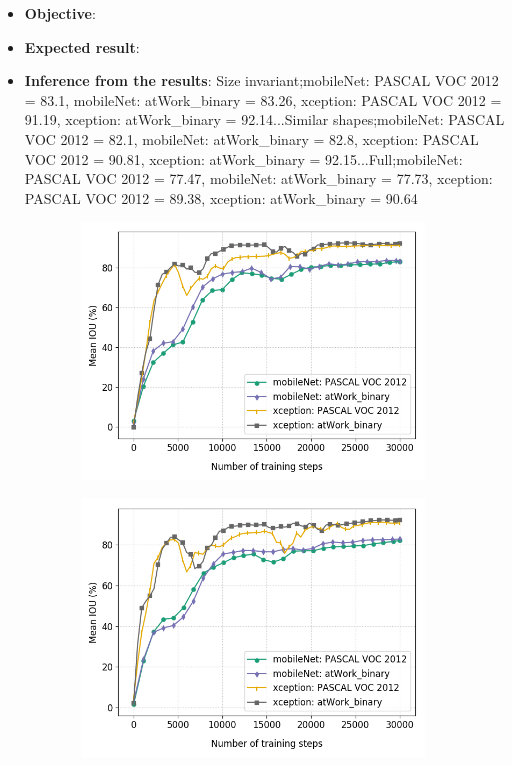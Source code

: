 	\begin{itemize}
		\item \textbf{Objective}:
		\item \textbf{Expected result}:
		\item \textbf{Inference from the results}: Size invariant;mobileNet: PASCAL VOC 2012 = 83.1, mobileNet: atWork\_binary = 83.26, xception: PASCAL VOC 2012 = 91.19, xception: atWork\_binary = 92.14...Similar shapes;mobileNet: PASCAL VOC 2012 = 82.1, mobileNet: atWork\_binary = 82.8, xception: PASCAL VOC 2012 = 90.81, xception: atWork\_binary = 92.15...Full;mobileNet: PASCAL VOC 2012 = 77.47, mobileNet: atWork\_binary = 77.73, xception: PASCAL VOC 2012 = 89.38, xception: atWork\_binary = 90.64
	\end{itemize}
	
	
	\begin{figure}
		\begin{subfigure}{.3\textwidth}
			\centering
			\includegraphics[width=1\linewidth]{images/transfer_size}
			\caption{}
		\end{subfigure}
		\begin{subfigure}{.3\textwidth}
			\centering
			\includegraphics[width=1\linewidth]{images/transfer_shape}

\end{subfigure}
\end{figure}

